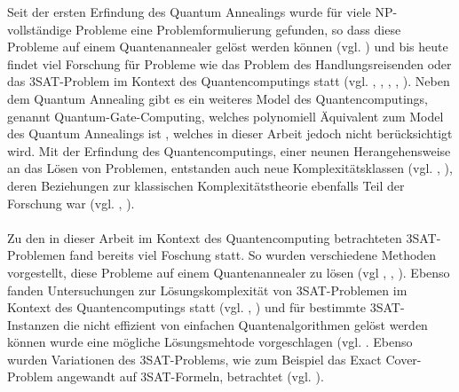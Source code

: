 Seit der ersten Erfindung des Quantum Annealings wurde für viele NP-vollständige Probleme eine Problemformulierung gefunden, so dass diese Probleme auf einem Quantenannealer gelöst werden können (vgl. \cite{lucas2014ising}) und bis heute findet viel Forschung für Probleme wie das Problem des Handlungsreisenden oder das 3SAT-Problem im Kontext des Quantencomputings statt (vgl. \cite{heim2017designing}, \cite{warren2017small}, \cite{moylett2017quantum}, \cite{strand2017zzz}, \cite{benjamin2017measurement}). Neben dem Quantum Annealing gibt es ein weiteres Model des Quantencomputings, genannt Quantum-Gate-Computing, welches polynomiell Äquivalent zum Model des Quantum Annealings ist \cite{mcgeoch2014adiabatic}, welches in dieser Arbeit jedoch nicht berücksichtigt wird. Mit der Erfindung des Quantencomputings, einer neunen Herangehensweise an das Lösen von Problemen, entstanden auch neue Komplexitätsklassen (vgl. \cite{klauck2017complexity}, \cite{morimae2017merlinization}), deren Beziehungen zur klassischen Komplexitätstheorie ebenfalls Teil der Forschung war (vgl. \cite{bernstein1997quantum}, \cite{marriott2005quantum}).\\\\Zu den in dieser Arbeit im Kontext des Quantencomputing betrachteten 3SAT-Problemen fand bereits viel Foschung statt. So wurden verschiedene Methoden vorgestellt, diese Probleme auf einem Quantenannealer zu lösen (vgl \cite{choi2011different}, \cite{choi2010adiabatic}, \cite{farhi2000quantum}). Ebenso fanden Untersuchungen zur Lösungskomplexität von 3SAT-Problemen im Kontext des Quantencomputings statt (vgl. \cite{van2001powerful}, \cite{farhi2000numerical}) und für bestimmte 3SAT-Instanzen die nicht effizient von einfachen Quantenalgorithmen gelöst werden können wurde eine mögliche Lösungsmehtode vorgeschlagen (vgl. \cite{farhi2009quantum}. Ebenso wurden Variationen des 3SAT-Problems, wie zum Beispiel das Exact Cover-Problem angewandt auf 3SAT-Formeln, betrachtet (vgl. \cite{farhi2001quantum}).

